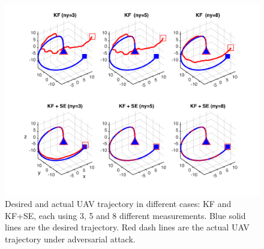 \documentclass[../../thesis.tex]{subfiles}
\begin{document}
\begin{figure}
\center
\includegraphics[width=\textwidth]{chapters/se_linear/figures/qh/uav_lqg_traj}
\caption{Desired and actual UAV trajectory in different cases: KF and KF+SE, each using 3, 5 and 8 different measurements. Blue solid lines are the desired trajectory. Red dash lines are the actual UAV trajectory under adversarial attack.}
\label{fig:ex_uav_traj}
\end{figure}


                                 
\end{document}
